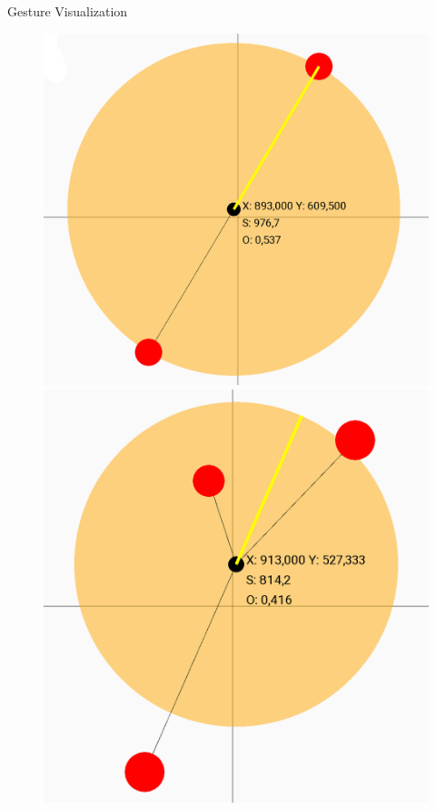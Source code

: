 \documentclass[t]{beamer}
\begin{document}
\begin{frame}{Gesture Visualization}
\begin{figure}
	\includegraphics[height=0.7\textheight]{assets/chpt_impl/syn_2touch}
	\includegraphics[height=0.7\textheight]{assets/chpt_impl/syn_3touch}
\end{figure}
\end{frame}
\end{document}

